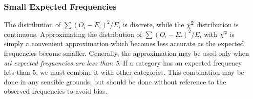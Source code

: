 \subsubsection{Small Expected Frequencies}

The distribution of $\sum (O_i - E_i)^2/E_i$ is discrete, while the $\chi^2$ distribution is continuous. Approximating the distribution of $\sum (O_i - E_i)^2/E_i$ with $\chi^2$ is simply a convenient approximation which becomes less accurate as the expected frequencies become smaller. Generally, the approximation may be used only when \emph{all expected frequencies are less than 5}. If a category has an expected frequency less than 5, we must combine it with other categories. This combination may be done in any sensible grounds, but should be done without reference to the observed frequencies to avoid bias.

